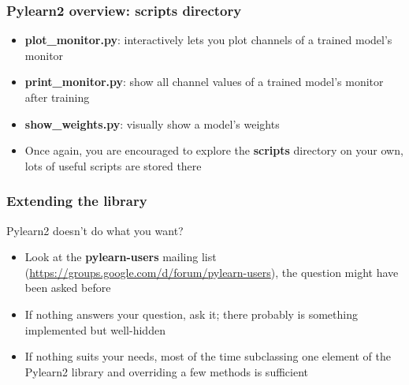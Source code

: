 \documentclass[mathserif, xcolor=dvipsnames]{beamer}
\begin{document}
\begin{frame}
    \frametitle{Pylearn2 overview: \textbf{scripts} directory}
    \Large
    \begin{itemize}\addtolength{\itemsep}{0.5\baselineskip}
        \item{\textbf{plot\_monitor.py}: interactively lets you plot channels of
              a trained model's monitor}
        \item{\textbf{print\_monitor.py}: show all channel values of a trained
              model's monitor after training}
        \item{\textbf{show\_weights.py}: visually show a model's weights}
        \item{Once again, you are encouraged to explore the \textbf{scripts}
              directory on your own, lots of useful scripts are stored there}
    \end{itemize}

\end{frame}

\begin{frame}
    \frametitle{Extending the library}
    \LARGE
    Pylearn2 doesn't do what you want?
    \begin{itemize}\addtolength{\itemsep}{0.5\baselineskip}
            \large
            \item{Look at the \textbf{pylearn-users} mailing list
                  (\url{https://groups.google.com/d/forum/pylearn-users}),
                  the question might have been asked before}
            \item{If nothing answers your question, ask it; there probably is
                  something implemented but well-hidden}
            \item{If nothing suits your needs, most of the time subclassing one
                  element of the Pylearn2 library and overriding a few methods
                  is sufficient}
    \end{itemize}
\end{frame}
\end{document}
